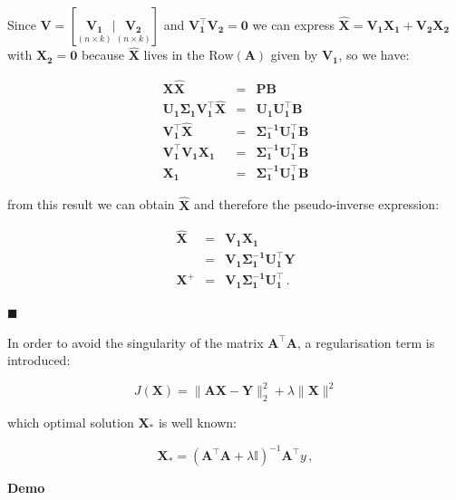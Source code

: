 Since $\mathbf{V} = [\underset{(n \times k)}{\mathbf{V_1}} |
\underset{(n \times k)}{\mathbf{V_2}}]$ and $\mathbf{V_1^\top V_2 =
0}$ we can express $\mathbf{\hat{\mathbf{X}}} = \mathbf{V_1 \mathbf{X}_1 + V_2 \mathbf{X}_2}$
with $\mathbf{\mathbf{X}_2=0}$ because $\mathbf{\hat{\mathbf{X}}}$ lives in the
$\text{Row}(\mathbf{A})$ given by $\mathbf{V_1}$, so we have:

\begin{eqnarray*}
\mathbf{X \hat{\mathbf{X}}} &=& \mathbf{PB} \\
\mathbf{U_1 \Sigma_1 V_1^\top \hat{\mathbf{X}}} &=& \mathbf{U_1 U_1^\top B} \\
\mathbf{ V_1^\top \hat{\mathbf{X}}} &=&  \mathbf{\Sigma_1^{-1} U_1^\top B} \\ 
\mathbf{ V_1^\top V_1 \mathbf{X}_1} &=& \mathbf{\Sigma_1^{-1}
U_1^\top B} \\
\mathbf{\mathbf{X}_1}&=& \mathbf{\Sigma_1^{-1} U_1^\top B}
\end{eqnarray*}

\noindent from this result we can obtain $\mathbf{\hat{\mathbf{X}}}$ and
therefore the pseudo-inverse expression:

\begin{eqnarray*}
\mathbf{\hat{\mathbf{X}}} &=& \mathbf{V_1 \mathbf{X}_1} \\
                &=& \mathbf{V_1 \Sigma_1^{-1} U_1^\top Y} \\
\mathbf{X^+} &=& \mathbf{V_1 \Sigma_1^{-1} U_1^\top} \, .
\end{eqnarray*}

$\blacksquare$


In order to avoid the singularity of the matrix $\mathbf{A}^\top \mathbf{A}$, a regularisation term is introduced: 

\begin{equation*}
\label{eq:problem} 
J(\mathbf{\mathbf{X}}) =  \| \mathbf{A}\mathbf{\mathbf{X}} - \mathbf{Y} \|_2^2  + \lambda
 \| \mathbf{\mathbf{X}}\| ^2
\end{equation*}

\noindent which optimal solution $\mathbf{\mathbf{X}}_*$ is well known: 

\begin{equation*}
\label{eq:optsolRR}
\mathbf{\mathbf{X}}_*=(\mathbf{A}^\top \mathbf{A}+\lambda \mathbb{I})^{-1}\mathbf{A}^\top y \, ,
\end{equation*}

\textbf{Demo}\quad

